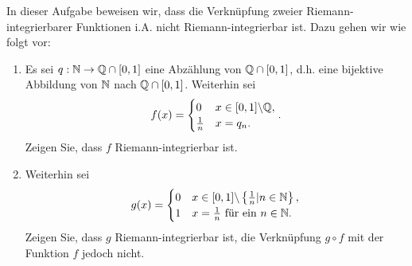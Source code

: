 \begin{Problem}
	In dieser Aufgabe beweisen wir, dass die Verknüpfung zweier Riemann-integrierbarer Funktionen i.A. nicht Riemann-integrierbar ist. Dazu gehen wir wie folgt vor:
	\begin{enumerate}[label=(\alph*)]
		\item Es sei $q:\mathbb{N} \to \mathbb{Q}\cap [0,1]$ eine Abzählung von $\mathbb{Q}\cap [0,1]$, d.h. eine bijektive Abbildung von $\mathbb{N}$ nach $\mathbb{Q}\cap [0,1]$. Weiterhin sei
			 \[
			f(x)=\begin{cases}
				0 & x\in [0,1]\backslash \mathbb{Q}, \\
				\frac{1}{n} & x=q_n.
			\end{cases}
			.\] 
			Zeigen Sie, dass $f$ Riemann-integrierbar ist.
		\item Weiterhin sei
			\[
			g(x)=\begin{cases}
				0 & x\in [0,1]\backslash \left\{ \frac{1}{n}|n\in \mathbb{N} \right\},\\
				1 & x=\frac{1}{n}\text{ f\"{u}r ein }n\in \mathbb{N}.
			\end{cases}
			\] 
			Zeigen Sie, dass $g$ Riemann-integrierbar ist, die Verknüpfung $g\circ f$ mit der Funktion $f$ jedoch nicht. 
	\end{enumerate}
\end{Problem}
